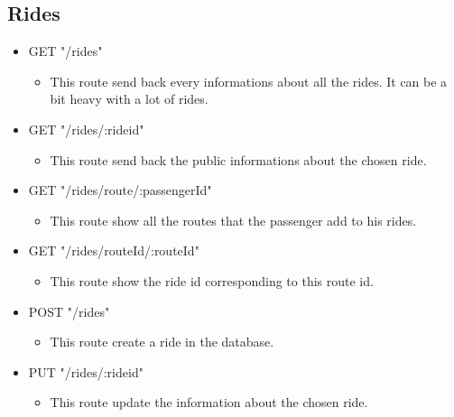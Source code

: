 \subsection{Rides}
\begin{itemize}
	\item GET "/rides"
	\begin{itemize}
		\item This route send back every informations about all the rides. It can be a bit heavy with a lot of rides.
	\end{itemize}
\end{itemize}

\begin{itemize}
	\item GET "/rides/:rideid"
	\begin{itemize}
		\item This route send back the public informations about the chosen ride.
	\end{itemize}
\end{itemize}

\begin{itemize}
	\item GET "/rides/route/:passengerId"
	\begin{itemize}
		\item This route show all the routes that the passenger add to his rides.
	\end{itemize}
\end{itemize}

\begin{itemize}
	\item GET "/rides/routeId/:routeId"
	\begin{itemize}
		\item This route show the ride id corresponding to this route id.
	\end{itemize}
\end{itemize}

\begin{itemize}
	\item POST "/rides"
	\begin{itemize}
		\item This route create a ride in the database.
	\end{itemize}
\end{itemize}

\begin{itemize}
	\item PUT "/rides/:rideid"
	\begin{itemize}
		\item This route update the information about the chosen ride.
	\end{itemize}
\end{itemize}

